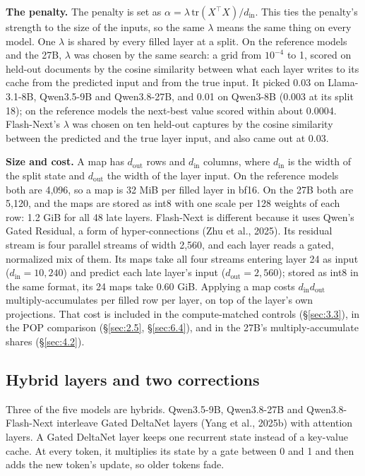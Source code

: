 \documentclass[11pt]{article}
\begin{document}
\textbf{The penalty.} The penalty is set as $\alpha = \lambda\,\mathrm{tr}(X^\top X)/d_\text{in}$. This ties the penalty's strength to the size of the inputs, so the same $\lambda$ means the same thing on every model. One $\lambda$ is shared by every filled layer at a split. On the reference models and the 27B, $\lambda$ was chosen by the same search: a grid from $10^{-4}$ to 1, scored on held-out documents by the cosine similarity between what each layer writes to its cache from the predicted input and from the true input. It picked 0.03 on Llama-3.1-8B, Qwen3.5-9B and Qwen3.8-27B, and 0.01 on Qwen3-8B (0.003 at its split 18); on the reference models the next-best value scored within about 0.0004. Flash-Next's $\lambda$ was chosen on ten held-out captures by the cosine similarity between the predicted and the true layer input, and also came out at 0.03.

\textbf{Size and cost.} A map has $d_\text{out}$ rows and $d_\text{in}$ columns, where $d_\text{in}$ is the width of the split state and $d_\text{out}$ the width of the layer input. On the reference models both are 4,096, so a map is 32 MiB per filled layer in bf16. On the 27B both are 5,120, and the maps are stored as int8 with one scale per 128 weights of each row: 1.2 GiB for all 48 late layers. Flash-Next is different because it uses Qwen's Gated Residual, a form of hyper-connections (Zhu et al., 2025). Its residual stream is four parallel streams of width 2,560, and each layer reads a gated, normalized mix of them. Its maps take all four streams entering layer 24 as input ($d_\text{in} = 10{,}240$) and predict each late layer's input ($d_\text{out} = 2{,}560$); stored as int8 in the same format, its 24 maps take 0.60 GiB. Applying a map costs $d_\text{in} d_\text{out}$ multiply-accumulates per filled row per layer, on top of the layer's own projections. That cost is included in the compute-matched controls (\S\ref{sec:3.3}), in the POP comparison (\S\ref{sec:2.5}, \S\ref{sec:6.4}), and in the 27B's multiply-accumulate shares (\S\ref{sec:4.2}).


\subsection{Hybrid layers and two corrections}\label{sec:2.3}
Three of the five models are hybrids. Qwen3.5-9B, Qwen3.8-27B and Qwen3.8-Flash-Next interleave Gated DeltaNet layers (Yang et al., 2025b) with attention layers. A Gated DeltaNet layer keeps one recurrent state instead of a key-value cache. At every token, it multiplies its state by a gate between 0 and 1 and then adds the new token's update, so older tokens fade.
\end{document}
